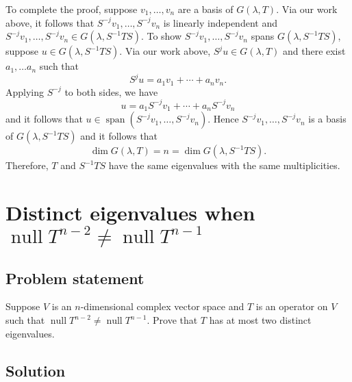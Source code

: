 \documentclass{article}
\begin{document}
To complete the proof, suppose $v_1,\ldots,v_n$ are a basis of $G(\lambda,T)$. Via our work above, it follows that $S^{-j}v_1,\ldots,S^{-j}v_n$ is linearly independent and $S^{-j}v_1,\ldots,S^{-j}v_n\in G(\lambda,S^{-1}TS)$. To show $S^{-j}v_1,\ldots,S^{-j}v_n$ spans $G(\lambda,S^{-1}TS)$, suppose $u\in G(\lambda,S^{-1}TS)$. Via our work above, $S^ju\in G(\lambda,T)$ and there exist $a_1,\ldots a_n$ such that 
\[S^ju=a_1v_1+\cdots +a_nv_n.\]
Applying $S^{-j}$ to both sides, we have
\[u=a_1S^{-j}v_1+\cdots +a_nS^{-j}v_n\]
and it follows that $u\in\operatorname{span}(S^{-j}v_1,\ldots,S^{-j}v_n)$. Hence $S^{-j}v_1,\ldots,S^{-j}v_n$ is a basis of $G(\lambda,S^{-1}TS)$ and it follows that 
\[\operatorname{dim}G(\lambda,T)=n=\operatorname{dim}G(\lambda,S^{-1}TS).\]
Therefore, $T$ and $S^{-1}TS$ have the same eigenvalues with the same multiplicities.

\clearpage

\section{Distinct eigenvalues when $\operatorname{null}T^{n-2}\neq\operatorname{null}T^{n-1}$}
\subsection*{Problem statement}
Suppose $V$ is an $n$-dimensional complex vector space and $T$ is an operator on $V$ such that $\operatorname{null}T^{n-2}\neq\operatorname{null}T^{n-1}$. Prove that $T$ has at most two distinct eigenvalues.

\subsection*{Solution}
\end{document}
